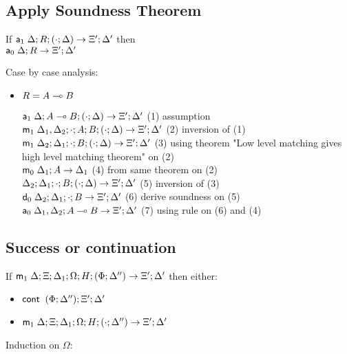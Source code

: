 \documentclass[9pt]{article}
\begin{document}
\subsection{Apply Soundness Theorem}

If $\mathsf{a}_1 \; \Delta; R; (\cdot; \Delta) \rightarrow \Xi'; \Delta'$ then \\
      $\mathsf{a}_0 \; \Delta; R \rightarrow \Xi'; \Delta'$

Case by case analysis:

\begin{itemize}
\item $R = A \multimap B$

$\mathsf{a}_1 \; \Delta; A \multimap B ; (\cdot ; \Delta) \rightarrow \Xi'; \Delta'$ \hfill (1) assumption \\
$\mathsf{m}_1 \; \Delta_1, \Delta_2; \cdot; A ; B ; (\cdot ; \Delta) \rightarrow \Xi'; \Delta'$ \hfill (2) inversion of (1) \\
$\mathsf{m}_1 \; \Delta_2; \Delta_1; \cdot ; B ; (\cdot ; \Delta) \rightarrow \Xi'; \Delta'$ \hfill (3) using theorem "Low level matching gives high level matching theorem" on (2) \\
$\mathsf{m}_0 \; \Delta_1 ; A \rightarrow \Delta_1$ \hfill (4) from same theorem on (2) \\
$\do \Delta_2; \Delta_1; \cdot ; B ; (\cdot ; \Delta) \rightarrow \Xi'; \Delta'$ \hfill (5) inversion of (3) \\
$\mathsf{d}_0 \; \Delta_2; \Delta_1; \cdot ; B \rightarrow \Xi'; \Delta'$ \hfill (6) derive soundness on (5) \\
$\mathsf{a}_0 \; \Delta_1, \Delta_2; A \multimap B \rightarrow \Xi'; \Delta'$ \hfill (7) using rule on (6) and (4) \\
\end{itemize}

\subsection{Success or continuation}

If $\mathsf{m}_1 \; \Delta; \Xi; \Delta_1; \Omega; H; (\Phi; \Delta'') \rightarrow \Xi'; \Delta'$ then either:

\begin{itemize}
   \item $\mathsf{cont} \; \; (\Phi; \Delta''); \Xi'; \Delta'$
   \item $\mathsf{m}_1 \; \Delta; \Xi; \Delta_1; \Omega; H; (\cdot; \Delta'') \rightarrow \Xi'; \Delta'$
\end{itemize}

Induction on $\Omega$:
\end{document}
